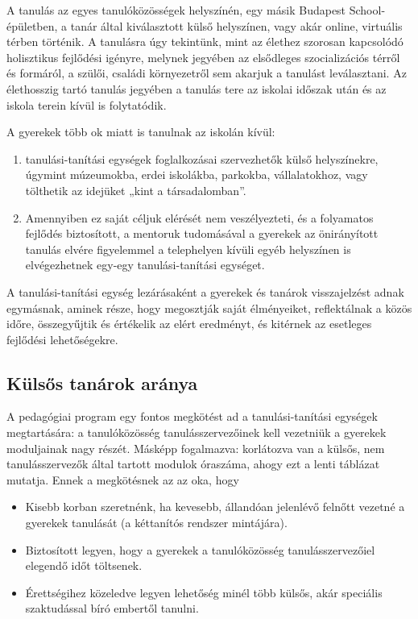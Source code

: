 A tanulás az egyes tanulóközösségek helyszínén, egy másik Budapest\break
School-épületben, a tanár által kiválasztott külső helyszínen, vagy akár
online, virtuális térben történik. A tanulásra úgy tekintünk, mint az
élethez szorosan kapcsolódó holisztikus fejlődési igényre, melynek
jegyében az elsődleges szocializációs térről és formáról, a szülői,
családi környezetről sem akarjuk a tanulást leválasztani. Az élethosszig
tartó tanulás jegyében a tanulás tere az iskolai időszak után és az
iskola terein kívül is folytatódik.

A gyerekek több ok miatt is tanulnak az iskolán kívül:

\begin{enumerate}
\def\labelenumi{\arabic{enumi}.}
\item
  tanulási-tanítási egységek foglalkozásai szervezhetők külső
  helyszínekre, úgymint múzeumokba, erdei iskolákba, parkokba,
  vállalatokhoz, vagy tölthetik az idejüket „kint a társadalomban''.
\item
  Amennyiben ez saját céljuk elérését nem veszélyezteti, és a folyamatos
  fejlődés biztosított, a mentoruk tudomásával a gyerekek az
  önirányított tanulás elvére figyelemmel a telephelyen kívüli egyéb
  helyszínen is elvégezhetnek egy-egy tanulási-tanítási egységet.
\end{enumerate}

A tanulási-tanítási egység lezárásaként a gyerekek és tanárok
visszajelzést adnak egymásnak, aminek része, hogy megosztják saját
élményeiket, reflektálnak a közös időre, összegyűjtik és értékelik az
elért eredményt, és kitérnek az esetleges fejlődési lehetőségekre.

\hypertarget{kulsos-tanarok-aranya}{%
\subsection{Külsős tanárok aránya}\label{kulsos-tanarok-aranya}}

A pedagógiai program egy fontos megkötést ad a tanulási-tanítási
egységek megtartására: a tanulóközösség tanulásszervezőinek kell
vezetniük a gyerekek moduljainak nagy részét.  Másképp fogalmazva:
korlátozva van a külsős, nem tanulásszervezők által tartott modulok
óraszáma, ahogy ezt a lenti táblázat mutatja. Ennek a megkötésnek az az
oka, hogy

\begin{itemize}
\item
  Kisebb korban szeretnénk, ha kevesebb, állandóan jelenlévő felnőtt
  vezetné a gyerekek tanulását (a kéttanítós rendszer mintájára).
\item
  Biztosított legyen, hogy a gyerekek a tanulóközösség
  tanulásszervezőiel elegendő időt töltsenek.
\item
  Érettségihez közeledve legyen lehetőség minél több külsős, akár\break
  speciális szaktudással bíró embertől tanulni.
\end{itemize}


